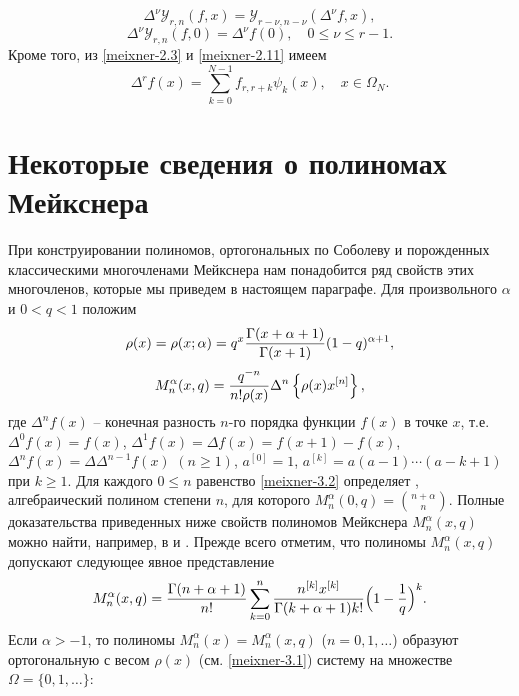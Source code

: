  \begin{equation}\label{meixner-2.15}
 \Delta^\nu\mathcal{Y}_{r,n}(f,x) = \mathcal{Y}_{r-\nu,n-\nu}(\Delta^\nu f,x),
  \end{equation}
\begin{equation}\label{sob-tcheb-difference-2.16}
\Delta^\nu\mathcal{Y}_{r,n}(f,0) = \Delta^\nu f(0), \quad 0\le \nu\le r-1.
\end{equation}
Кроме того, из \eqref{meixner-2.3} и \eqref{meixner-2.11} имеем
 \begin{equation}\label{sob-tcheb-difference-2.17}
 \Delta^r f(x)= \sum_{k=0}^{N-1} f_{r,r+k} \psi_{k}(x), \quad x\in \Omega_{N}.
  \end{equation}

\section{Некоторые сведения о полиномах Мейкснера}
При конструировании полиномов, ортогональных по Соболеву и порожденных классическими многочленами Мейкснера нам понадобится ряд свойств этих многочленов, которые мы приведем в настоящем параграфе.
 Для произвольного $\alpha$ и $0<q<1$ положим
\begin{equation}
\rho(x)=\rho(x;\alpha)=q^x{\Gamma(x+\alpha+1)\over \Gamma(x+1)}(1-q)^{\alpha+1}, \label{meixner-3.1}
\end{equation}
\begin{equation}\label{meixner-3.2}
M_n^{\alpha}(x,q)={q^{-n}\over n!\rho(x)}\Delta^n
\left\{\rho(x)x^{[n]}\right\},
\end{equation}
 где $\Delta^nf(x)$ -- конечная разность $n$-го порядка функции
     $f(x)$ в точке $x$, т.е. $\Delta^0f(x)=f(x)$,
$\Delta^1f(x)=\Delta f(x)=f(x+1)-f(x)$, $\Delta^nf(x)=\Delta
\Delta^{n-1}f(x)$ $(n\ge1)$, $a^{[0]}=1$,
$a^{[k]}=a(a-1)\cdots(a-k+1)$ при $k\ge1$. Для каждого $0\le n$ равенство \eqref{meixner-3.2} определяет \cite{meixner-22}, алгебраический полином степени $n$,   для которого
$
M_n^{\alpha}(0,q)={n+\alpha\choose n}.
$
Полные доказательства приведенных ниже свойств полиномов Мейкснера $M_n^{\alpha}(x,q)$
можно найти, например, в  \cite{meixner-22} и \cite{meixner-23}. Прежде всего отметим, что полиномы  $M_n^{\alpha}(x,q)$ допускают  следующее явное представление
\begin{equation}\label{meixner-3.3}
M_n^{\alpha}(x,q)={\Gamma(n+\alpha+1)\over
n!}\sum_{k=0}^n {n^{[k]}x^{[k]}\over
\Gamma(k+\alpha+1) k!}\Big(1-\frac{1}{q}\Big)^k.
\end{equation}
Если $\alpha>-1$, то полиномы $M_n^{\alpha}(x)=M_n^{\alpha}(x,q)$ ($n=0,1,\ldots$) образуют ортогональную  с весом $\rho(x)$ (см. \eqref{meixner-3.1}) систему  на множестве $\Omega=\{0,1,\ldots\}$:
